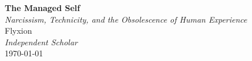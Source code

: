\documentclass[12pt]{memoir}
\begin{document}
\begin{titlingpage}
  \vspace*{2cm}
  \begin{center}
    {\LARGE\bfseries The Managed Self}\\[0.6em]
    {\large\itshape Narcissism, Technicity, and the Obsolescence of Human Experience}\\[2.5em]
    {\normalsize Flyxion}\\[0.5em]
    {\small\itshape Independent Scholar}\\[3em]
    {\small\today}
  \end{center}
  \vfill
\end{titlingpage}

\end{document}
